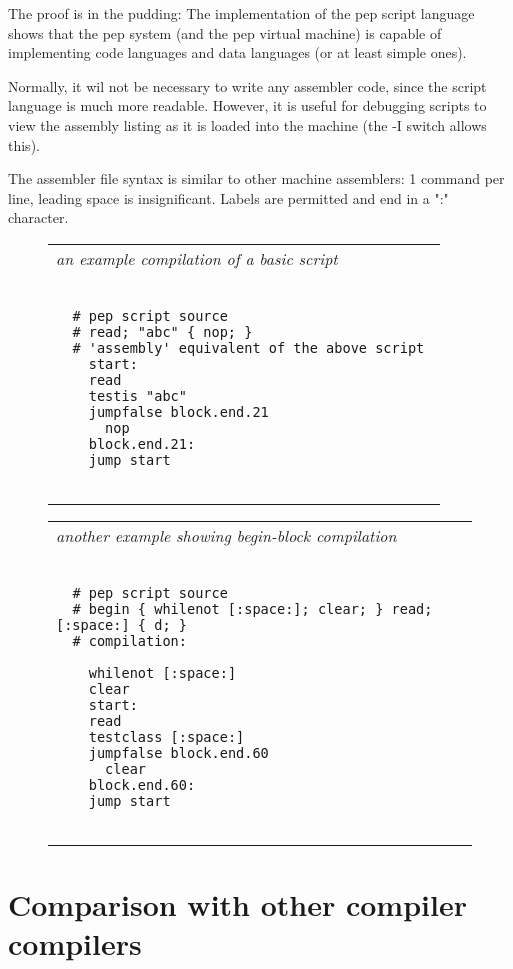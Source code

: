 \documentclass[a4paper,12pt]{article}
\begin{document}
  The proof is in the pudding: The implementation of the pep script language
  shows that the pep system (and the pep virtual machine) is capable of
  implementing code languages and data languages (or at least simple ones).

  Normally, it wil not be necessary to write any assembler code,
  since the script language is much more readable. However, it
  is useful for debugging scripts to view the assembly listing as
  it is loaded into the machine (the -I switch allows this).

  The assembler file syntax is similar to other machine assemblers:
  1 command per line, leading space is insignificant. Labels are
  permitted and end in a ":" character.
 \begin{figure}
 \begin{tabular}{ l }
 \emph{ an example compilation of a basic script  } \\ 
 \begin{lstlisting}[breaklines] 
 
  # pep script source
  # read; "abc" { nop; }
  # 'assembly' equivalent of the above script 
    start:
    read
    testis "abc"
    jumpfalse block.end.21
      nop
    block.end.21:
    jump start 
  
 \end{lstlisting} 
 \end{tabular} 

 \end{figure}
 \begin{figure}
 \begin{tabular}{ l }
 \emph{ another example showing begin-block compilation  } \\ 
 \begin{lstlisting}[breaklines] 

  # pep script source
  # begin { whilenot [:space:]; clear; } read; [:space:] { d; }
  # compilation:

    whilenot [:space:]
    clear
    start:
    read
    testclass [:space:]
    jumpfalse block.end.60
      clear
    block.end.60:
    jump start 
  
 \end{lstlisting} 
 \end{tabular} 

 \end{figure}

\section{Comparison with other compiler compilers}
\end{document}
